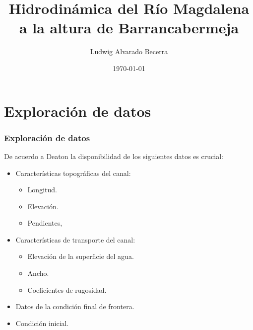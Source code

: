 \documentclass[17pt, t, lualatex]{beamer}
\title{Hidrodinámica del Río Magdalena a la altura de Barrancabermeja}
\date{\today}
\institute[UJTL]{Universidad Jorge Tadeo Lozano}
\author{Ludwig Alvarado Becerra}
\begin{document}
\inserttitlepage

\section{Exploración de datos}

\insertsectionpage

\begin{frame}[allowframebreaks]
  \frametitle{Exploración de datos}
  De acuerdo a Deaton\cite{deaton1999dynamic} la disponibilidad de los siguientes datos es crucial:

  \begin{itemize}
    \item Características topográficas del canal:
          \begin{itemize}
            \item Longitud.
            \item Elevación.
            \item Pendientes,
          \end{itemize}
    \item Características de transporte del canal:
          \begin{itemize}
            \item Elevación de la superficie del agua.
            \item Ancho.
            \item Coeficientes de rugosidad.
          \end{itemize}
    \item Datos de la condición final de frontera.
    \item Condición inicial.
  \end{itemize}

\end{frame}
\end{document}
